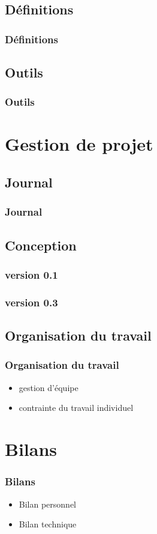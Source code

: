 \documentclass{beamer}
\begin{document}
		\subsection{Définitions}
			\begin{frame}
			  \frametitle{Définitions}
			\end{frame}
			
		\subsection{Outils}
			\begin{frame}
				\frametitle{Outils}
			\end{frame}
			
			
	\section{Gestion de projet}
	
		\subsection{Journal}
			\begin{frame}
			  \frametitle{Journal}
			\end{frame}
			
		\subsection{Conception}
			\begin{frame}
				\frametitle{version 0.1}
			\end{frame}
			\begin{frame}
				\frametitle{version 0.3}
			\end{frame}
		
		\subsection{Organisation du travail}
			\begin{frame}
			  \frametitle{Organisation du travail}
			  \begin{itemize}
			    \item gestion d'équipe
			    \item contrainte du travail individuel
			  \end{itemize}
			\end{frame}
		
		
	\section{Bilans}
	  \begin{frame}
      \frametitle{Bilans}
		  \begin{itemize}
		    \item Bilan personnel
		    \item Bilan technique
		  \end{itemize}
	  \end{frame}
		

			
			
\end{document}

